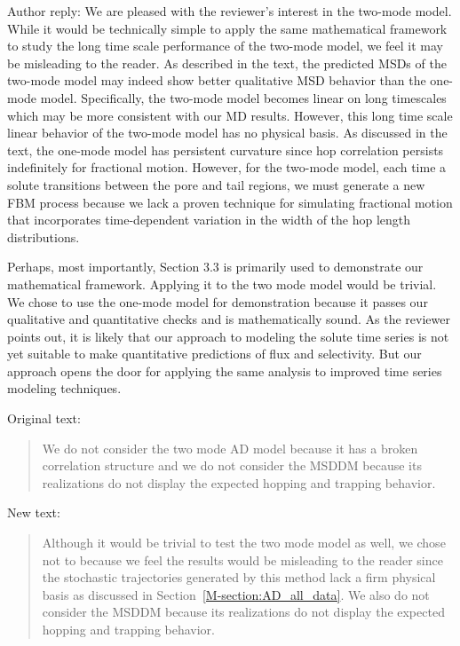 \documentclass{article}
\begin{document}
\begin{enumerate}[label={Comment \theenumi :}, leftmargin=3.9\parindent]
        Author reply: We are pleased with the reviewer's interest in the two-mode model. While it
        would be technically simple to apply the same mathematical framework to study the long time
        scale performance of the two-mode model, we feel it may be misleading to the reader.
        As described in the text, the predicted MSDs of the two-mode model may indeed show better 
        qualitative MSD behavior than the one-mode model. Specifically, the two-mode model becomes
        linear on long timescales which may be more consistent with our MD results. However, this 
        long time scale linear behavior of the two-mode model has no physical basis. As discussed
        in the text, the one-mode model has persistent curvature since hop correlation persists 
        indefinitely for fractional motion. However, for the two-mode model, each time a solute 
        transitions between the pore and tail regions, we must generate a new FBM process because
        we lack a proven technique for simulating fractional motion that incorporates time-dependent
        variation in the width of the hop length distributions.
        
        Perhaps, most importantly, Section 3.3 is primarily used to demonstrate our mathematical
        framework. Applying it to the two mode model would be trivial. We chose to use the one-mode 
        model for demonstration because it passes our qualitative and quantitative checks and is
        mathematically sound. As the reviewer points out, it is likely that our approach to 
        modeling the solute time series is not yet suitable to make quantitative predictions of 
        flux and selectivity. But our approach opens the door for applying the same analysis to 
        improved time series modeling techniques.
        
        Original text:
        \begin{quote}
        We do not consider the two mode AD model because it has a broken correlation structure 
        and we do not consider the MSDDM because its realizations do not display the expected 
        hopping and trapping behavior. 
        \end{quote}
        
        New text:
        \begin{quote}
        Although it would be trivial to test the two mode model as well, we chose not to because
        we feel the results would be misleading to the reader since the stochastic trajectories
        generated by this method lack a firm physical basis as discussed in Section~\ref{M-section:AD_all_data}. 
        We also do not consider the MSDDM because its realizations do not display the expected 
        hopping and trapping behavior. 
        \end{quote}
  

\end{enumerate}
\end{document}
